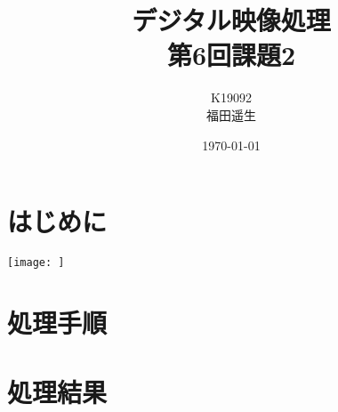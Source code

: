 \documentclass[a4paper,11pt]{jsarticle}
\begin{document}
\title{デジタル映像処理\\第6回課題2}
\author{K19092\\福田遥生}
\date{\today}
\maketitle

\section{はじめに}
\texttt{[image: ]}
\section{処理手順}

\section{処理結果}
\end{document}
